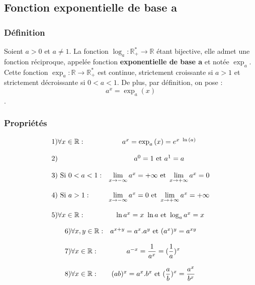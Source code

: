 \documentclass[oneside,11pt,french,table]{book}
\theoremstyle{definition}
\theoremstyle{plain}
\theoremstyle{remark}
\begin{document}
 \subsection{Fonction exponentielle de base a}
 \subsubsection{Définition} Soient $a>0$ et $a\neq 1$. La fonction $\log_a:\mathbb{R}_+^*\to \mathbb{R}$ étant bijective, elle admet une fonction réciproque, appelée fonction \textbf{exponentielle de base a } et notée $\exp_a$. Cette fonction $\exp_a:\mathbb{R}\to \mathbb{R}_+^*$ est continue, strictement croissante si $a>1$ et strictement décroissante si $0<a<1$. De plus, par définition, on pose : $$ a^x=\exp_a{(x)}$$.
 \subsubsection{Propriétés}
  $$  \begin{array}{l c }
          1) \forall x\in \mathbb{R} :& a^x=\exp_a{(x)}=e^{x\ \ln{(a)}}  \\ \\
          2) & a^0=1 \text{ et } a^1=a \\ \\
          3) \text{ Si } 0<a<1 : & \lim\limits_{x\to -\infty}{a^x}= +\infty \text{ et } \lim\limits_{x\to +\infty}{a^x}= 0 
          \\
          \\
          4)\text{ Si } a>1 :& \lim\limits_{x\to -\infty}{a^x}= 0 \text{ et } \lim\limits_{x\to +\infty}{a^x}= +\infty \\ 
          \\
          5) \forall x\in \mathbb{R} :& \ \ln{a^x}=x\ \ln{a} \text{ et } \log_a{a^x}=x 
          \end{array}$$
          

         $$ \begin{array}{l c }
          6) \forall x,y\in \mathbb{R} :& a^{x+y}=a^x.a^y \text{ et } (a^x)^y=a^{xy}\\ \\
          7) \forall x\in \mathbb{R} :& a^{-x}=\displaystyle\frac{1}{a^x}=(\displaystyle\frac{1}{a})^x \\
          \\
          8) \forall x\in \mathbb{R} :& (ab)^x=a^x.b^x \text{ et } (\displaystyle\frac{a}{b})^x=\displaystyle\frac{a^x}{b^x}
     \end{array} $$
\end{document}
